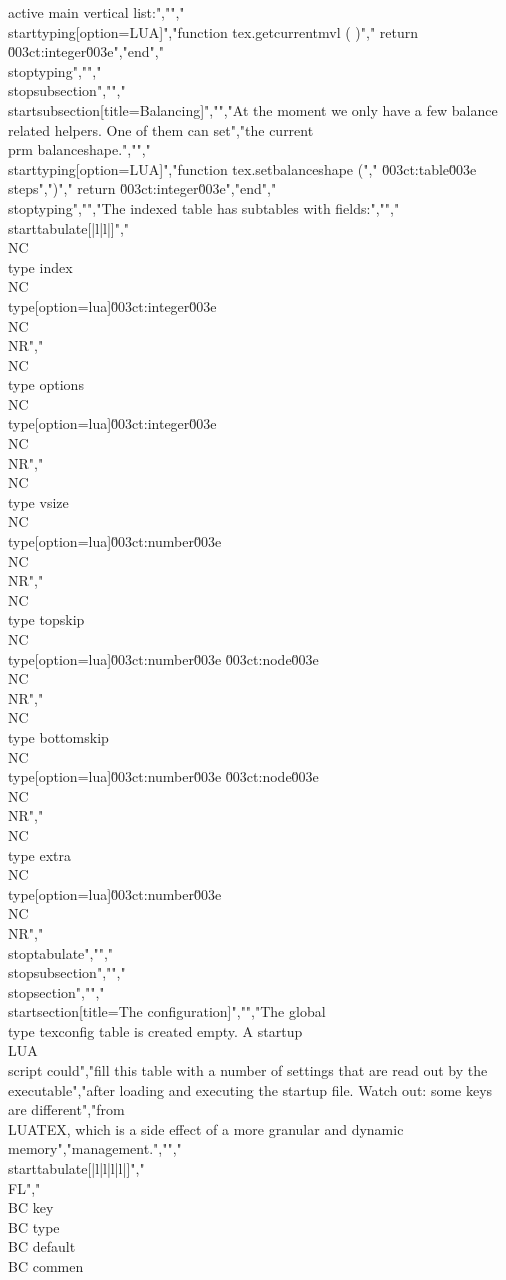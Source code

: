  active main vertical list:","","\\starttyping[option=LUA]","function tex.getcurrentmvl ( )","    return \u003ct:integer\u003e","end","\\stoptyping","","\\stopsubsection","","\\startsubsection[title=Balancing]","","At the moment we only have a few balance related helpers. One of them can set","the current \\prm {balanceshape}.","","\\starttyping[option=LUA]","function tex.setbalanceshape (","    \u003ct:table\u003e steps",")","    return \u003ct:integer\u003e","end","\\stoptyping","","The indexed table has subtables with fields:","","\\starttabulate[|l|l|]","\\NC \\type {index}      \\NC \\type[option=lua]{\u003ct:integer\u003e}         \\NC \\NR","\\NC \\type {options}    \\NC \\type[option=lua]{\u003ct:integer\u003e}         \\NC \\NR","\\NC \\type {vsize}      \\NC \\type[option=lua]{\u003ct:number\u003e}          \\NC \\NR","\\NC \\type {topskip}    \\NC \\type[option=lua]{\u003ct:number\u003e \u003ct:node\u003e} \\NC \\NR","\\NC \\type {bottomskip} \\NC \\type[option=lua]{\u003ct:number\u003e \u003ct:node\u003e} \\NC \\NR","\\NC \\type {extra}      \\NC \\type[option=lua]{\u003ct:number\u003e}          \\NC \\NR","\\stoptabulate","","\\stopsubsection","","\\stopsection","","\\startsection[title={The configuration}]","","The global \\type {texconfig} table is created empty. A startup \\LUA\\ script could","fill this table with a number of settings that are read out by the executable","after loading and executing the startup file. Watch out: some keys are different","from \\LUATEX, which is a side effect of a more granular and dynamic memory","management.","","\\starttabulate[|l|l|l|l|]","\\FL","\\BC key                       \\BC type         \\BC default  \\BC commen